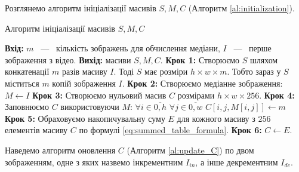 Розглянемо алгоритм ініціалізації масивів $S, M, C$ (Алгоритм \ref{al:initialization}).
\begin{algorithm}[H]
    \caption{Алгоритм ініціалізації масивів $S, M, C$}
    \begin{algorithmic}
        \State \textbf{Вхід:} $m$ ~---~ кількість зображень для обчислення медіани,
        $I$ ~---~ перше зображення з відео.
        \State \textbf{Вихід:} масиви $S, M, C$.
        \State \textbf{Крок 1:} Створюємо $S$ шляхом конкатенації $m$ разів масиву $I$.
        Тоді $S$ має розміри $h \times w \times m$. Тобто зараз у $S$ міститься
        $m$ копій зображення $I$.
        \State \textbf{Крок 2:} Створюємо медіанне зображення: $M \gets I$
        \State \textbf{Крок 3:} Створюємо нульовий масив $C$ розмірами $h \times w \times 256$.
        \State \textbf{Крок 4:} Заповнюємо $C$ використовуючи $M$:
        \State $\forall i \in \overline{0,h}$
        \State \qquad $\forall j \in \overline{0,w}$
        \State \qquad \qquad $C[i,j,M[i,j]] \gets m$
        \State \textbf{Крок 5:} Обраховуємо накопичувальну суму $E$ для кожного масиву з $256$ елементів
        масиву $C$ по формулі \ref{eq:summed_table_formula}.
        \State \textbf{Крок 6:} $C \gets E$.
    \end{algorithmic}
    \label{al:initialization}
\end{algorithm}

Наведемо алгоритм оновлення $C$ (Алгоритм \ref{al:update_C}) по двом зображенням,
одне з яких назвемо інкрементним $I_{in}$, а інше декрементним $I_{de}$.

